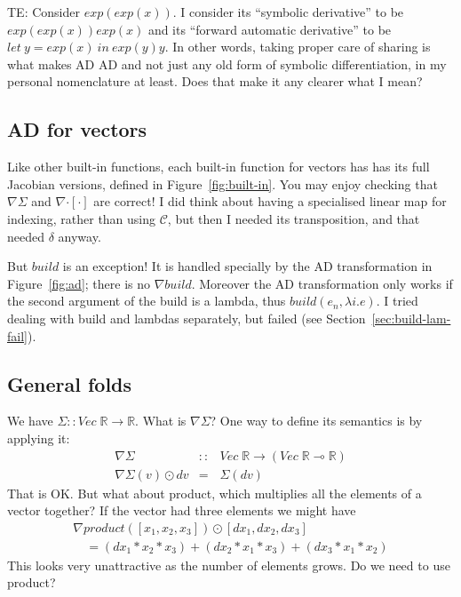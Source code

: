\documentclass[sigplan,review]{acmart}
\renewcommand{\to}{\rightarrow}    %
\newcommand{\linto}{\multimap}     %
\newcommand{\gradf}[1]{\nabla\! \mathit{#1}}  %
\newcommand{\buildfun}{\mathit{build}}
\newcommand{\sumfun}{\Sigma}
\newcommand{\deltafun}{\delta}
\newcommand{\indexfun}[2]{#1[#2]}   %
\renewcommand{\vector}[1]{\mathit{Vec}\;#1}
\newcommand{\real}{\mathbb{R}}       %
\newcommand{\lmapply}{\odot}   %
\newcommand{\lmcomp}{\,\circ\,}   %
\newcommand{\lmbuildt}{\mathcal C}             %
\newcommand{\tom}[1]{{\color{red}TE: #1}}
\begin{document}
\tom{Consider $exp(exp(x))$.  I consider its ``symbolic derivative''
  to be $exp(exp(x)) exp(x)$ and its ``forward automatic derivative''
  to be $let~ y = exp(x)~ in~ exp(y) y$.  In other words, taking
  proper care of sharing is what makes AD AD and not just any old form
  of symbolic differentiation, in my personal nomenclature at least.
  Does that make it any clearer what I mean?}

\subsection{AD for vectors} \label{sec:ad-vectors}

Like other built-in functions, each built-in function for vectors
has has its full Jacobian versions, defined in Figure~\ref{fig:built-in}.
You may enjoy checking that $\gradf{\sumfun}$ and
$\gradf{\indexfun{\cdot}{\cdot}}$ are correct!  I did think about having
a specialised linear map for indexing, rather than using $\lmbuildt$,
but then I needed its transposition, and that needed $\deltafun$ anyway.

But $\buildfun$ is an exception!  It is handled specially
by the AD transformation in Figure~\ref{fig:ad}; there is no $\gradf{\buildfun}$.
Moreover the AD transformation only works if the second argument of the build is
a lambda, thus $\buildfun(e_n, \lambda i.e)$.  I tried dealing with build and
lambdas separately, but failed (see Section~\ref{sec:build-lam-fail}).

\subsection{General folds}

We have $\sumfun :: \vector{\real} \to \real$.  What is $\gradf{\sumfun}$?
One way to define its semantics is by applying it:
$$
\begin{array}{rcl}
  \gradf{\sumfun} & :: & \vector{\real} \to (\vector{\real} \linto \real) \\
  \gradf{\sumfun}(v) \lmapply dv & = & \sumfun(dv)
\end{array}
$$
That is OK.  But what about product, which multiplies all the elements
of a vector together? If the vector had three elements we might have
$$
\begin{array}{l}
  \gradf{product}([x_1,x_2,x_3]) \lmapply [dx_1, dx_2, dx_3] \\
  \quad = (dx_1 * x_2 * x_3) + (dx_2 * x_1 * x_3) + (dx_3 * x_1 * x_2)
\end{array}
$$
This looks very unattractive as the number of elements grows.  Do we need
to use product?
\end{document}
